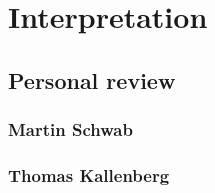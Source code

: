 \chapter{Interpretation}
\thispagestyle{fancy}

\section{Personal review}

\subsection{Martin Schwab}

\subsection{Thomas Kallenberg}


